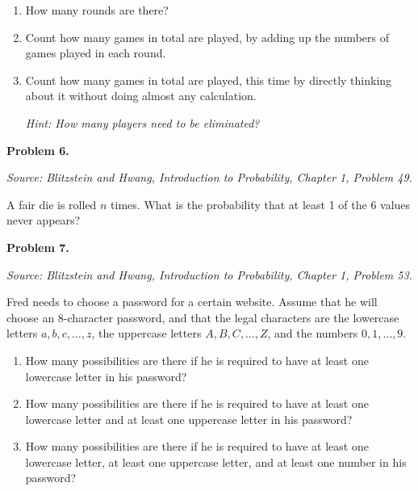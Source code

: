\documentclass[11pt]{article}
\newcommand{\source}[1]{%
    \vspace{0.15cm}
    {\small\textit{Source: Blitzstein and Hwang, \textit{Introduction to Probability}, Chapter 1, Problem #1.}}
}
\begin{document}
\begin{enumerate}[label=(\alph*), leftmargin=*]
    \item How many rounds are there?

    \item Count how many games in total are played, by adding up the numbers of games played in each round.

    \item Count how many games in total are played, this time by directly thinking about it without doing almost any calculation.

    \emph{Hint: How many players need to be eliminated?}
\end{enumerate}

\vfill
 
\newpage


\begin{problemheader}
\textbf{Problem 6.} \hfill  
\end{problemheader}
\source{49}

A fair die is rolled $n$ times. What is the probability that at least 1 of the 6 values never appears?

\vfill
 
\newpage


\begin{problemheader}
\textbf{Problem 7. } \hfill 
\end{problemheader}
\source{53}

Fred needs to choose a password for a certain website. Assume that he will choose an 8-character password, and that the legal characters are the lowercase letters $a,b,c,\dots,z$, the uppercase letters $A,B,C,\dots,Z$, and the numbers $0,1,\dots,9$.

\begin{enumerate}[label=(\alph*), leftmargin=*]
    \item How many possibilities are there if he is required to have at least one lowercase letter in his password?

    \item How many possibilities are there if he is required to have at least one lowercase letter and at least one uppercase letter in his password?

    \item How many possibilities are there if he is required to have at least one lowercase letter, at least one uppercase letter, and at least one number in his password?
\end{enumerate}

\vfill
 
\end{document}
